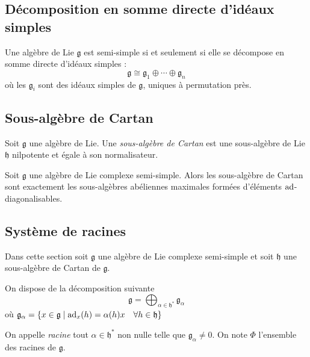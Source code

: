 \omitted

\subsection{Décomposition en somme directe d'idéaux simples}

\begin{proposition}
    Une algèbre de Lie $\mathfrak{g}$ est semi-simple si et seulement si elle se décompose en somme directe d'idéaux simples :
    $$\mathfrak{g} \cong \mathfrak{g}_1 \oplus \cdots \oplus \mathfrak{g}_n$$
    où les $\mathfrak{g}_i$ sont des idéaux simples de $\mathfrak{g}$, uniques à permutation près.
\end{proposition}

\omitted

\subsection{Sous-algèbre de Cartan}

\begin{definition}
    Soit $\mathfrak{g}$ une algèbre de Lie. Une \emph{sous-algèbre de Cartan} est une sous-algèbre de Lie $\mathfrak{h}$ nilpotente et égale à son normalisateur.
\end{definition}

\begin{proposition}
    Soit $\mathfrak{g}$ une algèbre de Lie complexe semi-simple. Alors les sous-algèbre de Cartan sont exactement les sous-algèbres abéliennes maximales formées d'éléments $\operatorname{ad}$-diagonalisables.
\end{proposition}

\omitted

\subsection{Système de racines}

Dans cette section soit $\mathfrak{g}$ une algèbre de Lie complexe semi-simple et soit $\mathfrak{h}$ une sous-algèbre de Cartan de $\mathfrak{g}$.

\begin{proposition}
    On dispose de la décomposition suivante 
    $$\mathfrak{g} = \bigoplus_{\alpha \in \mathfrak{h}^*}\mathfrak{g}_\alpha$$
    où $\mathfrak{g}_\alpha = \{x\in \mathfrak{g} \mid \operatorname{ad}_x(h) = \alpha(h)x \quad \forall h \in \mathfrak{h}\}$
\end{proposition}

\omitted

\begin{definition}
    On appelle \emph{racine} tout $\alpha \in \mathfrak{h}^*$ non nulle telle que $\mathfrak{g}_\alpha \neq 0$. On note $\Phi$ l'ensemble des racines de $\mathfrak{g}$.
\end{definition}

\nocite{humphreys2012introduction}
